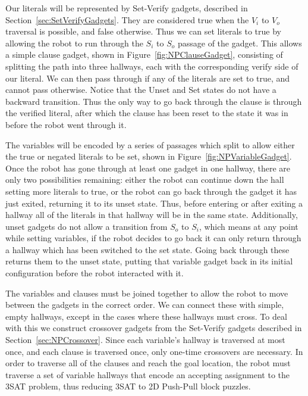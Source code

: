 Our literals will be represented by Set-Verify gadgets, described in Section~\ref{sec:SetVerifyGadgets}. They are considered true when the $V_i$ to $V_o$ traversal is possible, and false otherwise. Thus we can set literals to true by allowing the robot to run through the $S_i$ to $S_o$ passage of the gadget. This allows a simple clause gadget, shown in Figure~\ref{fig:NPClauseGadget}, consisting of splitting the path into three hallways, each with the corresponding verify side of our literal. We can then pass through if any of the literals are set to true, and cannot pass otherwise. Notice that the Unset and Set states do not have a backward transition. Thus the only way to go back through the clause is through the verified literal, after which the clause has been reset to the state it was in before the robot went through it.

The variables will be encoded by a series of passages which split to allow either the true or negated literals to be set, shown in Figure~\ref{fig:NPVariableGadget}. Once the robot has gone through at least one gadget in one hallway, there are only two possibilities remaining: either the robot can continue down the hall setting more literals to true, or the robot can go back through the gadget it has just exited, returning it to its unset state. Thus, before entering or after exiting a hallway all of the literals in that hallway will be in the same state. Additionally, unset gadgets do not allow a transition from $S_o$ to $S_i$, which means at any point while setting variables, if the robot decides to go back it can only return through a hallway which has been switched to the set state. Going back through these returns them to the unset state, putting that variable gadget back in its initial configuration before the robot interacted with it.

The variables and clauses must be joined together to allow the robot to move between the gadgets in the correct order. We can connect these with simple, empty hallways, except in the cases where these hallways must cross. To deal with this we construct crossover gadgets from the Set-Verify gadgets described in Section~\ref{sec:NPCrossover}. Since each variable's hallway is traversed at most once, and each clause is traversed once, only one-time crossovers are necessary. In order to traverse all of the clauses and reach the goal location, the robot must traverse a set of variable hallways that encode an accepting assignment to the 3SAT problem, thus reducing 3SAT to 2D Push-Pull block puzzles.


